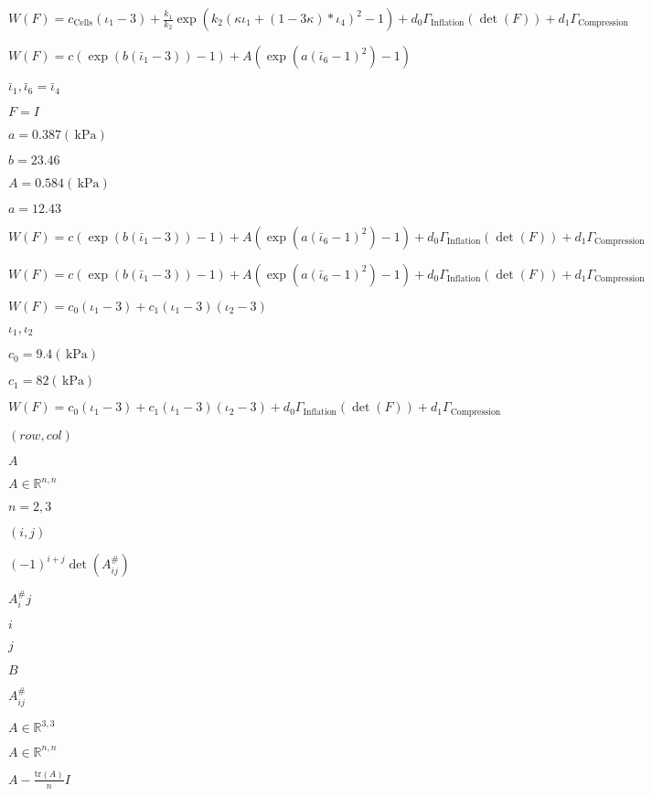 \documentclass{article}
\begin{document}
$ W(F)= c_\mathrm{Cells}(\iota_1-3) + \frac{k_1}{k_2}\exp(k_2(\kappa\iota_1+(1-3\kappa)*\iota_4)^2-1) + d_0\Gamma_\mathrm{Inflation}(\det(F)) + d_1\Gamma_\mathrm{Compression} $
\pagebreak

$ W(F)=c(\exp(b(\bar\iota_1-3))-1) + A(\exp(a(\bar\iota_6-1)^2)-1) $
\pagebreak

$\bar\iota_1,\bar\iota_6=\bar\iota_4$
\pagebreak

$F=I$
\pagebreak

$a=0.387 (\,\mathrm{kPa})$
\pagebreak

$ b = 23.46 $
\pagebreak

$ A = 0.584 (\,\mathrm{kPa}) $
\pagebreak

$ a = 12.43$
\pagebreak

$ W(F)=c(\exp(b(\bar\iota_1-3))-1) + A(\exp(a(\bar\iota_6-1)^2)-1) + d_0\Gamma_\mathrm{Inflation}(\det(F)) + d_1\Gamma_\mathrm{Compression} $
\pagebreak

$ W(F)=c(\exp(b(\bar\iota_1-3))-1) + A(\exp(a(\bar\iota_6-1)^2)-1) + d_0\Gamma_\mathrm{Inflation}(\det(F)) + d_1\Gamma_\mathrm{Compression}$
\pagebreak

$W(F)=c_0(\iota_1-3) + c_1(\iota_1-3)(\iota_2-3)$
\pagebreak

$\iota_1,\iota_2$
\pagebreak

$c_0=9.4 (\,\mathrm{kPa})$
\pagebreak

$ c_1 = 82 (\,\mathrm{kPa}) $
\pagebreak

$W(F)=c_0(\iota_1-3) + c_1(\iota_1-3)(\iota_2-3) + d_0\Gamma_\mathrm{Inflation}(\det(F)) + d_1\Gamma_\mathrm{Compression}$
\pagebreak

$(row,col)$
\pagebreak

$ A $
\pagebreak

$ A\in \mathbb{R}^{n,n} $
\pagebreak

$ n=2,3 $
\pagebreak

$(i,j)$
\pagebreak

$ (-1)^{i+j} \det(A^\#_{ij}) $
\pagebreak

$ A^\#_ij $
\pagebreak

$i$
\pagebreak

$ j $
\pagebreak

$ B $
\pagebreak

$ A^\#_{ij} $
\pagebreak

$ A\in \mathbb{R}^{3,3} $
\pagebreak

$ A\in\mathbb{R}^{n,n} $
\pagebreak

$ A - \frac{\mathrm{tr}(A)}{n}I $
\pagebreak
\end{document}
